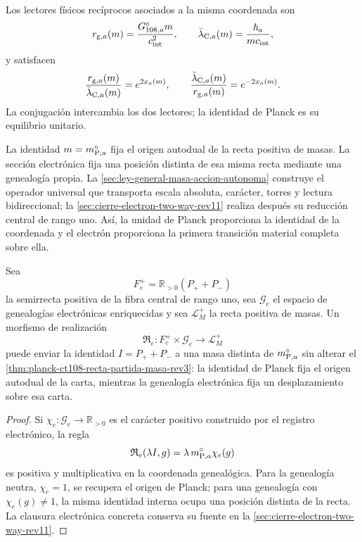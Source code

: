 Los lectores físicos recíprocos asociados a la misma coordenada son
\[
 r_{{\rm g},a}(m)=\frac{G_{108,a}^{\circ}m}{c_{\rm int}^{2}},
 \qquad
 \bar\lambda_{{\rm C},a}(m)=\frac{\hbar_a}{mc_{\rm int}},
\]
y satisfacen
\begin{equation}
 \frac{r_{{\rm g},a}(m)}{\bar\lambda_{{\rm C},a}(m)}
 =e^{2x_a(m)},
 \qquad
 \frac{\bar\lambda_{{\rm C},a}(m)}{r_{{\rm g},a}(m)}
 =e^{-2x_a(m)}.
 \label{eq:planck-ct108-lectores-exponenciales-rev3}
\end{equation}
La conjugación intercambia los dos lectores; la identidad de Planck es su
equilibrio unitario.

\begin{exactbox}[title={Identidad de Planck y clausura electrónica}]
La identidad \(m=m_{{\rm P},a}^{\circ}\) fija el origen autodual de la recta
positiva de masas. La sección electrónica fija una posición distinta de
esa misma recta mediante una genealogía propia. La
\cref{sec:ley-general-masa-accion-autonoma} construye el operador universal
que transporta escala absoluta, carácter, torres y lectura bidireccional;
la \cref{sec:cierre-electron-two-way-rev11} realiza después su reducción
central de rango uno. Así, la unidad de Planck proporciona la identidad de
la coordenada y el electrón proporciona la primera transición material
completa sobre ella.
\end{exactbox}

\begin{proposition}
\label{prop:planck-ct108-realizacion-centro-electron-rev3}
Sea
\[
 F_e^+=\mathbb R_{>0}(P_++P_-)
\]
la semirrecta positiva de la fibra central de rango uno, sea
\(\mathcal G_e\) el espacio de genealogías
electrónicas enriquecidas y sea \(\mathcal L_M^+\) la recta positiva de
masas. Un morfismo de realización
\[
 \mathfrak R_e:
 F_e^+\times\mathcal G_e\longrightarrow\mathcal L_M^+
\]
puede enviar la identidad \(I=P_++P_-\) a una masa distinta de
\(m_{{\rm P},a}^{\circ}\) sin alterar el
\cref{thm:planck-ct108-recta-partida-masa-rev3}: la identidad de Planck fija el
origen autodual de la carta, mientras la genealogía electrónica fija un
desplazamiento sobre esa carta.
\end{proposition}

\begin{proof}
Si \(\chi_e:\mathcal G_e\to\mathbb R_{>0}\) es el carácter positivo construido
por el registro electrónico, la regla
\[
 \mathfrak R_e(\lambda I,g)
 =\lambda\,m_{{\rm P},a}^{\circ}\chi_e(g)
\]
es positiva y multiplicativa en la coordenada genealógica. Para la genealogía
neutra, \(\chi_e=1\), se recupera el origen de Planck; para una genealogía con
\(\chi_e(g)\ne1\), la misma identidad interna ocupa una posición distinta de
la recta. La clausura electrónica concreta conserva su fuente en la
\cref{sec:cierre-electron-two-way-rev11}.
\end{proof}

